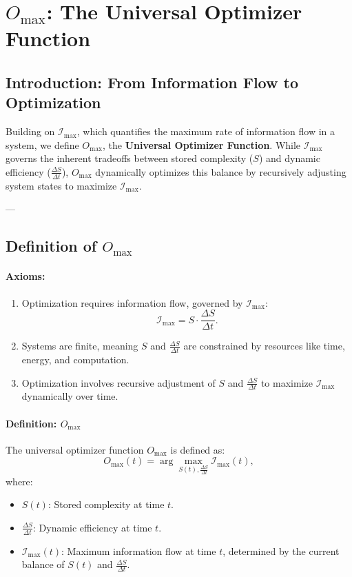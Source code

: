 \documentclass[12pt]{article}
\begin{document}
\section{\(O_{\text{max}}\): The Universal Optimizer Function}

\subsection{Introduction: From Information Flow to Optimization}

Building on \(\mathcal{I}_{\text{max}}\), which quantifies the maximum rate of information flow in a system, we define \(O_{\text{max}}\), the \textbf{Universal Optimizer Function}. While \(\mathcal{I}_{\text{max}}\) governs the inherent tradeoffs between stored complexity (\(S\)) and dynamic efficiency (\(\frac{\Delta S}{\Delta t}\)), \(O_{\text{max}}\) dynamically optimizes this balance by recursively adjusting system states to maximize \(\mathcal{I}_{\text{max}}\). 

---

\subsection{Definition of \(O_{\text{max}}\)}

\paragraph{Axioms:}
\begin{enumerate}
    \item Optimization requires information flow, governed by \(\mathcal{I}_{\text{max}}\):
    \[
    \mathcal{I}_{\text{max}} = S \cdot \frac{\Delta S}{\Delta t}.
    \]
    \item Systems are finite, meaning \(S\) and \(\frac{\Delta S}{\Delta t}\) are constrained by resources like time, energy, and computation.
    \item Optimization involves recursive adjustment of \(S\) and \(\frac{\Delta S}{\Delta t}\) to maximize \(\mathcal{I}_{\text{max}}\) dynamically over time.
\end{enumerate}

\paragraph{Definition: \(O_{\text{max}}\)}
The universal optimizer function \(O_{\text{max}}\) is defined as:
\[
O_{\text{max}}(t) = \arg \max_{S(t), \frac{\Delta S}{\Delta t}} \mathcal{I}_{\text{max}}(t),
\]
where:
\begin{itemize}
    \item \(S(t)\): Stored complexity at time \(t\).
    \item \(\frac{\Delta S}{\Delta t}\): Dynamic efficiency at time \(t\).
    \item \(\mathcal{I}_{\text{max}}(t)\): Maximum information flow at time \(t\), determined by the current balance of \(S(t)\) and \(\frac{\Delta S}{\Delta t}\).
\end{itemize}
\end{document}
